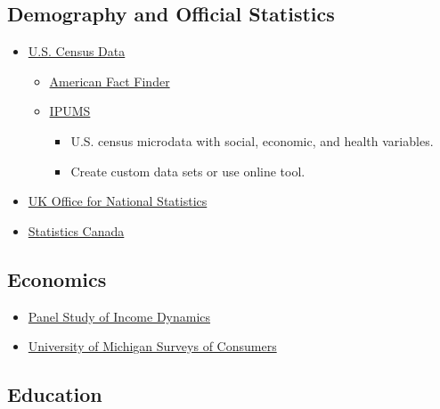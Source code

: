 \documentclass[]{book}
\providecommand{\tightlist}{%
  \setlength{\itemsep}{0pt}\setlength{\parskip}{0pt}}
\begin{document}
\hypertarget{demography-and-official-statistics}{%
\subsection{Demography and Official Statistics}\label{demography-and-official-statistics}}

\begin{itemize}
\item
  \href{https://www.census.gov/data.html}{U.S. Census Data}

  \begin{itemize}
  \tightlist
  \item
    \href{https://factfinder.census.gov/faces/nav/jsf/pages/index.xhtml}{American Fact Finder}
  \item
    \href{https://usa.ipums.org/usa/}{IPUMS}

    \begin{itemize}
    \tightlist
    \item
      U.S. census microdata with social, economic, and health variables.
    \item
      Create custom data sets or use online tool.
    \end{itemize}
  \end{itemize}
\item
  \href{https://www.ons.gov.uk/peoplepopulationandcommunity}{UK Office for National Statistics}
\item
  \href{https://www.statcan.gc.ca/eng/start}{Statistics Canada}
\end{itemize}

\hypertarget{economics}{%
\subsection{Economics}\label{economics}}

\begin{itemize}
\tightlist
\item
  \href{https://psidonline.isr.umich.edu/}{Panel Study of Income Dynamics}
\item
  \href{http://www.sca.isr.umich.edu/}{University of Michigan Surveys of Consumers}
\end{itemize}

\hypertarget{education}{%
\subsection{Education}\label{education}}
\end{document}
